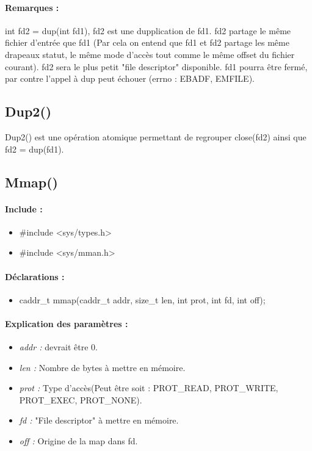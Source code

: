 \documentclass{article}[12pt]
\begin{document}
\paragraph{Remarques : } int fd2 = dup(int fd1), fd2 est une dupplication de fd1. fd2 partage le même fichier d'entrée que fd1 (Par cela on entend que fd1 et fd2 partage les même drapeaux statut, le même mode d'accès tout comme le même offset du fichier courant). fd2 sera le plus petit "file descriptor" disponible. fd1 pourra être fermé, par contre l'appel à dup peut échouer (errno : EBADF, EMFILE).
\subsection{Dup2()}
Dup2() est une opération atomique permettant de regrouper close(fd2) ainsi que fd2 = dup(fd1).
\subsection{Mmap()}
\paragraph{Include : }
\begin{itemize}
	\item \#include <sys/types.h>
	\item \#include <sys/mman.h>
\end{itemize}
\paragraph{Déclarations : }
\begin{itemize}
	\item caddr\_t mmap(caddr\_t addr, size\_t len, int prot, int fd, int off);
\end{itemize}
\paragraph{Explication des paramètres : }
\begin{itemize}
	\item \emph{addr : } devrait être 0.
	\item \emph{len : } Nombre de bytes à mettre en mémoire.
	\item \emph{prot : } Type d'accès(Peut être soit : PROT\_READ, PROT\_WRITE, PROT\_EXEC, PROT\_NONE).
	\item \emph{fd : } "File descriptor" à mettre en mémoire.
	\item \emph{off : } Origine de la map dans fd.
\end{itemize}
\end{document}

